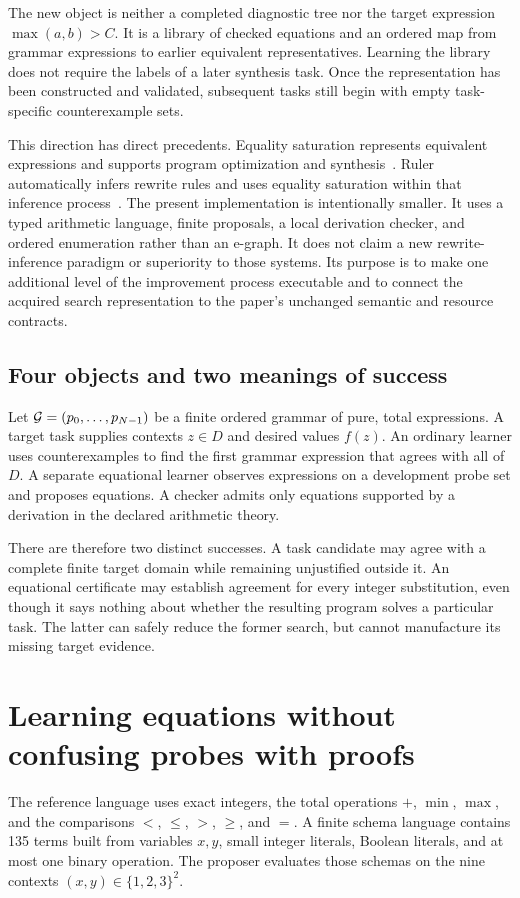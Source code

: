 \documentclass[11pt,letterpaper]{article}
\theoremstyle{plain}
\theoremstyle{definition}
\begin{document}
The new object is neither a completed diagnostic tree nor the target expression $\max(a,b)>C$. It is a library of checked equations and an ordered map from grammar expressions to earlier equivalent representatives. Learning the library does not require the labels of a later synthesis task. Once the representation has been constructed and validated, subsequent tasks still begin with empty task-specific counterexample sets.

This direction has direct precedents. Equality saturation represents equivalent expressions and supports program optimization and synthesis~\cite{egg}. Ruler automatically infers rewrite rules and uses equality saturation within that inference process~\cite{ruler}. The present implementation is intentionally smaller. It uses a typed arithmetic language, finite proposals, a local derivation checker, and ordered enumeration rather than an e-graph. It does not claim a new rewrite-inference paradigm or superiority to those systems. Its purpose is to make one additional level of the improvement process executable and to connect the acquired search representation to the paper's unchanged semantic and resource contracts.

\subsection{Four objects and two meanings of success}
Let $\mathcal G=(p_0,\ldots,p_{N-1})$ be a finite ordered grammar of pure, total expressions. A target task supplies contexts $z\in D$ and desired values $f(z)$. An ordinary learner uses counterexamples to find the first grammar expression that agrees with all of $D$. A separate equational learner observes expressions on a development probe set and proposes equations. A checker admits only equations supported by a derivation in the declared arithmetic theory.

There are therefore two distinct successes. A task candidate may agree with a complete finite target domain while remaining unjustified outside it. An equational certificate may establish agreement for every integer substitution, even though it says nothing about whether the resulting program solves a particular task. The latter can safely reduce the former search, but cannot manufacture its missing target evidence.

\section{Learning equations without confusing probes with proofs}\label{sec:equation-learning}
The reference language uses exact integers, the total operations $+$, $\min$, $\max$, and the comparisons $<$, $\le$, $>$, $\ge$, and $=$. A finite schema language contains 135 terms built from variables $x,y$, small integer literals, Boolean literals, and at most one binary operation. The proposer evaluates those schemas on the nine contexts $(x,y)\in\{1,2,3\}^2$.
\end{document}
